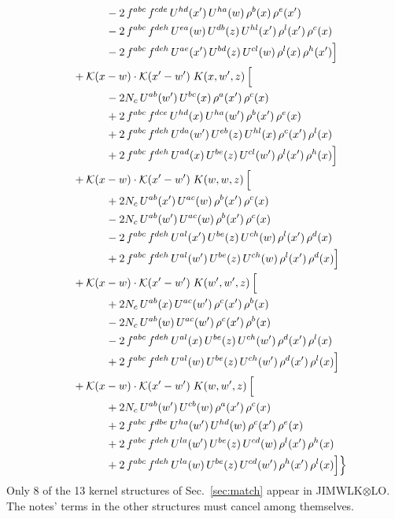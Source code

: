 \documentclass[10pt]{article}
\numberwithin{equation}{section}
\newcommand{\KK}{\mathcal K}
\begin{document}
\begin{align}
&\qquad\qquad -2\,f^{abc}\,f^{cde}\,U^{hd}(x')\,U^{ha}(w)\,\rho^{b}(x)\,\rho^{e}(x')\notag\\
&\qquad\qquad -2\,f^{abc}\,f^{deh}\,U^{ea}(w)\,U^{db}(z)\,U^{hl}(x')\,\rho^{l}(x')\,\rho^{c}(x)\notag\\
&\qquad\qquad -2\,f^{abc}\,f^{deh}\,U^{ae}(x')\,U^{bd}(z)\,U^{cl}(w)\,\rho^{l}(x)\,\rho^{h}(x')\Big]\notag\\
&\quad +\KK(x-w)\cdot\KK(x'-w')\;K(x,w',z)\,\Big[\notag\\
&\qquad\qquad - 2 N_c\,U^{ab}(w')\,U^{bc}(x)\,\rho^{a}(x')\,\rho^{c}(x)\notag\\
&\qquad\qquad +2\,f^{abc}\,f^{dce}\,U^{hd}(x)\,U^{ha}(w')\,\rho^{b}(x')\,\rho^{e}(x)\notag\\
&\qquad\qquad +2\,f^{abc}\,f^{deh}\,U^{da}(w')\,U^{eb}(z)\,U^{hl}(x)\,\rho^{c}(x')\,\rho^{l}(x)\notag\\
&\qquad\qquad +2\,f^{abc}\,f^{deh}\,U^{ad}(x)\,U^{be}(z)\,U^{cl}(w')\,\rho^{l}(x')\,\rho^{h}(x)\Big]\notag\\
&\quad +\KK(x-w)\cdot\KK(x'-w')\;K(w,w,z)\,\Big[\notag\\
&\qquad\qquad +2 N_c\,U^{ab}(x')\,U^{ac}(w)\,\rho^{b}(x')\,\rho^{c}(x)\notag\\
&\qquad\qquad - 2 N_c\,U^{ab}(w')\,U^{ac}(w)\,\rho^{b}(x')\,\rho^{c}(x)\notag\\
&\qquad\qquad -2\,f^{abc}\,f^{deh}\,U^{al}(x')\,U^{be}(z)\,U^{ch}(w)\,\rho^{l}(x')\,\rho^{d}(x)\notag\\
&\qquad\qquad +2\,f^{abc}\,f^{deh}\,U^{al}(w')\,U^{be}(z)\,U^{ch}(w)\,\rho^{l}(x')\,\rho^{d}(x)\Big]\notag\\
&\quad +\KK(x-w)\cdot\KK(x'-w')\;K(w',w',z)\,\Big[\notag\\
&\qquad\qquad +2 N_c\,U^{ab}(x)\,U^{ac}(w')\,\rho^{c}(x')\,\rho^{b}(x)\notag\\
&\qquad\qquad - 2 N_c\,U^{ab}(w)\,U^{ac}(w')\,\rho^{c}(x')\,\rho^{b}(x)\notag\\
&\qquad\qquad -2\,f^{abc}\,f^{deh}\,U^{al}(x)\,U^{be}(z)\,U^{ch}(w')\,\rho^{d}(x')\,\rho^{l}(x)\notag\\
&\qquad\qquad +2\,f^{abc}\,f^{deh}\,U^{al}(w)\,U^{be}(z)\,U^{ch}(w')\,\rho^{d}(x')\,\rho^{l}(x)\Big]\notag\\
&\quad +\KK(x-w)\cdot\KK(x'-w')\;K(w,w',z)\,\Big[\notag\\
&\qquad\qquad +2 N_c\,U^{ab}(w')\,U^{cb}(w)\,\rho^{a}(x')\,\rho^{c}(x)\notag\\
&\qquad\qquad +2\,f^{abc}\,f^{dbe}\,U^{ha}(w')\,U^{hd}(w)\,\rho^{c}(x')\,\rho^{e}(x)\notag\\
&\qquad\qquad +2\,f^{abc}\,f^{deh}\,U^{la}(w')\,U^{be}(z)\,U^{cd}(w)\,\rho^{l}(x')\,\rho^{h}(x)\notag\\
&\qquad\qquad +2\,f^{abc}\,f^{deh}\,U^{la}(w)\,U^{be}(z)\,U^{cd}(w')\,\rho^{h}(x')\,\rho^{l}(x)\Big]\Big\}\label{eq:Jdecomp}
\end{align}
Only 8 of the 13 kernel structures of Sec.~\ref{sec:match} appear in JIMWLK$\otimes$LO. The notes' terms in the other structures must cancel among themselves.
\end{document}
